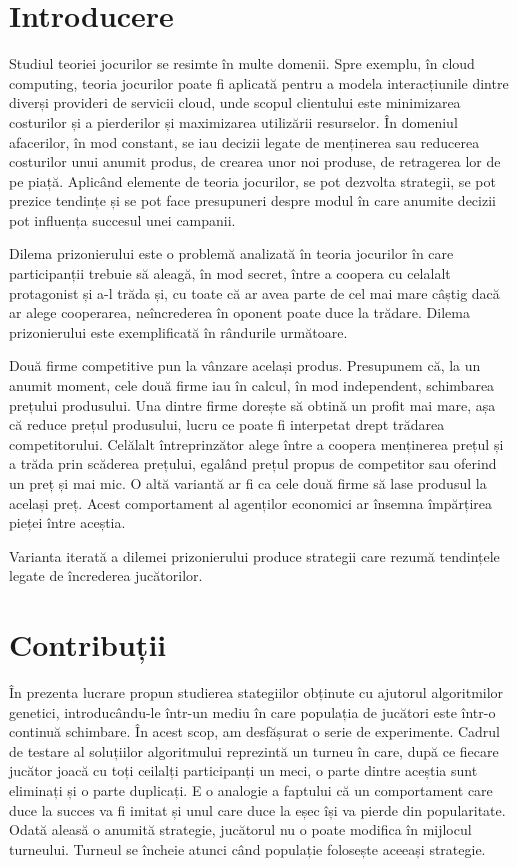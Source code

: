 \chapter*{Introducere}

Studiul teoriei jocurilor se resimte în multe domenii. Spre exemplu, în cloud computing, teoria jocurilor poate fi aplicată pentru a modela interacțiunile dintre diverși provideri de servicii cloud, unde scopul clientului este minimizarea costurilor și a pierderilor și maximizarea utilizării resurselor. În domeniul afacerilor, în mod constant, se iau decizii legate de menținerea sau reducerea costurilor unui anumit produs, de crearea unor noi produse, de retragerea lor de pe piață. Aplicând elemente de teoria jocurilor, se pot dezvolta strategii, se pot prezice tendințe și se pot face presupuneri despre modul în care anumite decizii pot influența succesul unei campanii. 

Dilema prizonierului este o problemă analizată în teoria jocurilor în care participanții trebuie să aleagă, în mod secret, între a coopera cu celalalt protagonist și a-l trăda și, cu toate că ar avea parte de cel mai mare câștig dacă ar alege cooperarea, neîncrederea în oponent poate duce la trădare.  Dilema prizonierului este exemplificată în rândurile următoare. 
 
Două firme competitive pun la vânzare același produs. Presupunem că, la un anumit moment, cele două firme iau în calcul, în mod independent, schimbarea prețului produsului. Una dintre firme dorește să obtină un profit mai mare, așa că reduce prețul produsului, lucru ce poate fi interpetat drept trădarea competitorului. Celălalt întreprinzător alege între a coopera menținerea prețul și a trăda prin scăderea prețului, egalând prețul propus de competitor sau oferind un preț și mai mic. O altă variantă ar fi ca cele două firme să lase produsul la același preț. Acest comportament al agenților economici ar însemna împărțirea pieței între aceștia. 
  
Varianta iterată a dilemei prizonierului produce strategii care rezumă tendințele legate de încrederea jucătorilor.  

\chapter*{Contribuții}

În prezenta lucrare propun studierea stategiilor obținute cu ajutorul algoritmilor genetici, introducându-le într-un mediu în care populația de jucători este într-o continuă schimbare.  În acest scop, am desfășurat o serie de experimente. Cadrul de testare al soluțiilor algoritmului reprezintă un turneu în care, după ce fiecare jucător joacă cu toți ceilalți participanți un meci, o parte dintre aceștia sunt eliminați și o parte duplicați. E o analogie a faptului că un comportament care duce la succes va fi imitat și unul care duce la eșec își va pierde din popularitate.  Odată aleasă o anumită strategie, jucătorul nu o poate modifica în mijlocul turneului. Turneul se încheie atunci când populație folosește aceeași strategie. 
 
